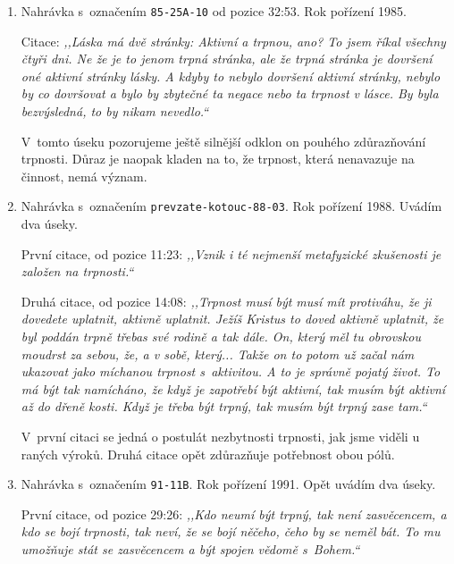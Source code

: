 \begin{enumerate}
{      Jako v~předchozím úseku je důraz kladen na nalezení mezí aktivity a
      pasivity a navíc na legitimitu obou pólů.
  }
  \item{
      Nahrávka s~označením \texttt{85-25A-10} od pozice 32:53. Rok pořízení 1985.

      Citace: \textit{%
        ,,Láska má dvě stránky: Aktivní a trpnou, ano? To jsem říkal všechny
        čtyři dni. Ne že je to jenom trpná stránka, ale že trpná stránka je
        dovršení oné aktivní stránky lásky. A kdyby to nebylo dovršení aktivní
        stránky, nebylo by co dovršovat a bylo by zbytečné ta negace nebo ta
        trpnost v lásce. By byla bezvýsledná, to by nikam nevedlo.``
      }

      V~tomto úseku pozorujeme ještě silnější odklon on pouhého zdůrazňování
      trpnosti. Důraz je naopak kladen na to, že trpnost, která nenavazuje na
      činnost, nemá význam.
  }
  \item{
      Nahrávka s~označením \texttt{prevzate-kotouc-88-03}. Rok pořízení 1988.
      Uvádím dva úseky.

      První citace, od pozice 11:23: \textit{%
        ,,Vznik i té nejmenší metafyzické zkušenosti je založen na trpnosti.``
      }

      Druhá citace, od pozice 14:08: \textit{%
        ,,Trpnost musí být musí mít protiváhu, že ji dovedete uplatnit, aktivně
        uplatnit. Ježíš Kristus to doved aktivně uplatnit, že byl poddán trpně
        třebas své rodině a tak dále. On, který měl tu obrovskou moudrst za
        sebou, že, a v sobě, který... Takže on to potom už začal nám ukazovat
        jako míchanou trpnost s~aktivitou. A to je správně pojatý život. To má
        být tak namícháno, že když je zapotřebí být aktivní, tak musím být
        aktivní až do dřeně kosti. Když je třeba být trpný, tak musím být trpný
        zase tam.``
      }

      V~první citaci se jedná o postulát nezbytnosti trpnosti, jak jsme viděli u
      raných výroků. Druhá citace opět zdůrazňuje potřebnost obou pólů.
  }
  \item{
      Nahrávka s~označením \texttt{91-11B}. Rok pořízení 1991. Opět uvádím dva
      úseky.

      První citace, od pozice 29:26: \textit{%
        ,,Kdo neumí být trpný, tak není zasvěcencem, a kdo se bojí trpnosti, tak
        neví, že se bojí něčeho, čeho by se neměl bát. To mu umožňuje stát se
        zasvěcencem a být spojen vědomě s~Bohem.``
      }

}
\end{enumerate}
